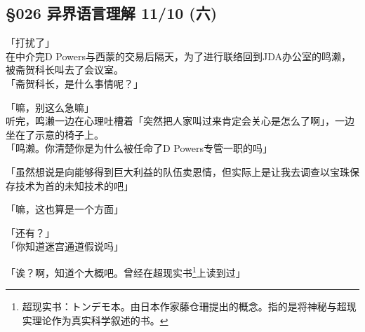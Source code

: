 \subsection{§026 异界语言理解 11/10 (六)}

「打扰了」\\

在中介完D Powers与西蒙的交易后隔天，为了进行联络回到JDA办公室的鸣濑，被斋贺科长叫去了会议室。\\

「斋贺科长，是什么事情呢？」

「嘛，别这么急嘛」\\

听完，鸣濑一边在心理吐槽着「突然把人家叫过来肯定会关心是怎么了啊」，一边坐在了示意的椅子上。\\

「鸣濑。你清楚你是为什么被任命了D Powers专管一职的吗」

「虽然想说是向能够得到巨大利益的队伍卖恩情，但实际上是让我去调查以宝珠保存技术为首的未知技术的吧」

「嘛，这也算是一个方面」

「还有？」\\

「你知道迷宫通道假说吗」

「诶？啊，知道个大概吧。曾经在超现实书\footnote{超现实书：トンデモ本。由日本作家藤仓珊提出的概念。指的是将神秘与超现实理论作为真实科学叙述的书。}上读到过」

